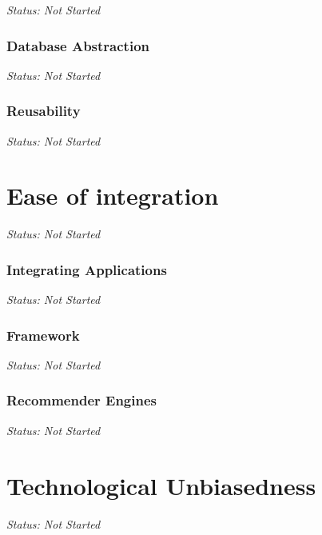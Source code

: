 \emph{Status: Not Started}

\subsubsection{Database Abstraction}

\emph{Status: Not Started}

\subsubsection{Reusability}

\emph{Status: Not Started}

\section{Ease of integration}

\emph{Status: Not Started}

\subsubsection{Integrating Applications}

\emph{Status: Not Started}

\subsubsection{Framework}

\emph{Status: Not Started}

\subsubsection{Recommender Engines}

\emph{Status: Not Started}

\section{Technological Unbiasedness}

\emph{Status: Not Started}
